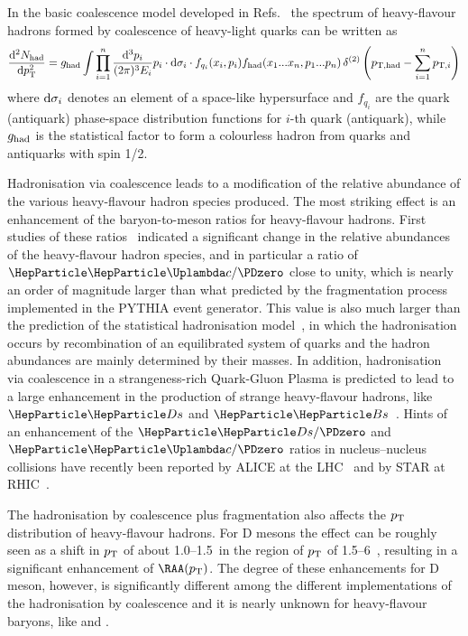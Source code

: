 In the basic coalescence model developed in Refs.~\cite{Greco:2003mm,Greco:2003vf,Fries:2003kq,Fries:2003vb,Oh:2009zj,Minissale:2015zwa,Plumari:2017ntm}
the spectrum of heavy-flavour hadrons formed by coalescence of heavy-light quarks can be written as
\begin{equation}
\label{eq-coal}
\frac{{\rm d}^{2}N_{\rm had}}{{\rm d}\pT^{2}}
= g_{\rm had} \int \prod^{n}_{i=1} \frac{{\rm d}^{3}p_{i}}{(2\pi)^{3}E_{i}} p_{i} 
\cdot {\rm d}\sigma_{i}  \cdot f_{q_i}(x_{i}, p_{i})  
f_{\rm had}(x_{1}...x_{n}, p_{1}...p_{n})\, 
\delta^{(2)} \left(p_{\rm T,had}-\sum^{n}_{i=1} p_{{\rm T},i}\right)
\end{equation}
where ${\rm d}\sigma_{i}$ denotes an element of a space-like hypersurface and $f_{q_i}$ are the quark (antiquark)
phase-space distribution functions for $i$-th quark (antiquark), while $g_{\rm had}$ is the statistical factor
to form a colourless hadron from quarks and antiquarks with spin 1/2.

Hadronisation via coalescence leads to a modification of the relative abundance of the
various heavy-flavour hadron species produced. 
The most striking effect is an enhancement of the baryon-to-meson ratios for heavy-flavour hadrons.
First studies of these ratios~\cite{Oh:2009zj,Plumari:2017ntm} indicated a significant change in the relative abundances of the heavy-flavour hadron species, and in particular a ratio of $\PGLc/\PDzero$ close to unity, which
is nearly an order of magnitude larger than what predicted by the fragmentation
process implemented in the PYTHIA event generator. 
This value is also much larger than the
prediction of the statistical hadronisation model~\cite{Andronic:2007zu}, in which the hadronisation occurs by recombination of an equilibrated system of quarks and the hadron abundances are mainly determined by their masses.
In addition, hadronisation via coalescence in a strangeness-rich Quark-Gluon Plasma is predicted to lead to a large enhancement in the production of strange heavy-flavour hadrons, like $\PDs$ and $\PBs$~\cite{Kuznetsova:2006hx,He:2014cla,Song:2015ykw}.
Hints of an enhancement of the $\PDs/\PDzero$ and $\PGLc/\PDzero$ ratios in nucleus--nucleus collisions have recently been reported by ALICE at the LHC~\cite{Acharya:2018hre,Peng:2018pwj} and by STAR at RHIC~\cite{Radhakrishnan:2018xxx}.

The hadronisation by coalescence plus fragmentation also affects the $p\sb{\scriptstyle\mathrm{T}}$ distribution  of heavy-flavour hadrons. For D mesons the effect can be roughly seen as a
shift in $p\sb{\scriptstyle\mathrm{T}}$ of about 1.0--1.5~\UGeVc in the region of $p\sb{\scriptstyle\mathrm{T}}$ of 1.5--6~\UGeVc, resulting in a
significant enhancement of $\RAA(\pT)$. The degree of these enhancements for D meson, however, is
significantly different  among the different implementations of the hadronisation
by coalescence and it is nearly unknown for heavy-flavour baryons, like \PGLb and \PGLc.

